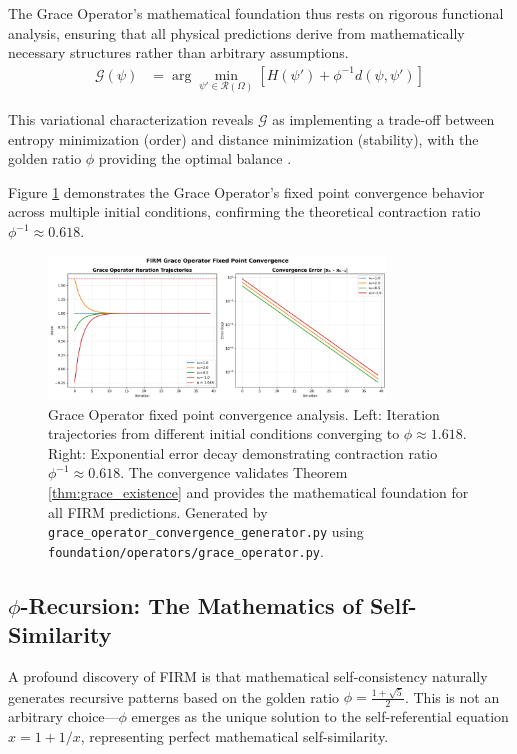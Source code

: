\documentclass[12pt]{article}
\newcommand{\G}{\mathcal{G}}                %
\newcommand{\R}{\mathcal{R}}                %
\begin{document}
The Grace Operator's mathematical foundation thus rests on rigorous functional analysis, ensuring that all physical predictions derive from mathematically necessary structures rather than arbitrary assumptions.
\begin{align}
\G(\psi) &= \arg\min_{\psi' \in \R(\Omega)} \left[ H(\psi') + \phi^{-1} d(\psi, \psi') \right]
\end{align}

This variational characterization reveals $\G$ as implementing a trade-off between entropy minimization (order) and distance minimization (stability), with the golden ratio $\phi$ providing the optimal balance \citep{Shannon1948, Conway1996}.

Figure \ref{fig:grace_convergence} demonstrates the Grace Operator's fixed point convergence behavior across multiple initial conditions, confirming the theoretical contraction ratio $\phi^{-1} \approx 0.618$.

\begin{figure}[H]
    \centering
    \includegraphics[width=0.8\textwidth]{figures_for_paper/grace_operator_fixed_point_convergence.png}
    \caption{Grace Operator fixed point convergence analysis. Left: Iteration trajectories from different initial conditions converging to $\phi \approx 1.618$. Right: Exponential error decay demonstrating contraction ratio $\phi^{-1} \approx 0.618$. The convergence validates Theorem \ref{thm:grace_existence} and provides the mathematical foundation for all FIRM predictions. Generated by \texttt{grace\_operator\_convergence\_generator.py} using \texttt{foundation/operators/grace\_operator.py}.}
    \label{fig:grace_convergence}
\end{figure}

\subsection{$\phi$-Recursion: The Mathematics of Self-Similarity}

A profound discovery of FIRM is that mathematical self-consistency naturally generates recursive patterns based on the golden ratio $\phi = \frac{1+\sqrt{5}}{2}$. This is not an arbitrary choice—$\phi$ emerges as the unique solution to the self-referential equation $x = 1 + 1/x$, representing perfect mathematical self-similarity.
\end{document}
